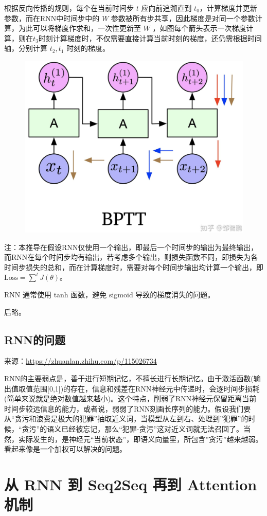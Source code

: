 \documentclass[12pt]{article}
\begin{document}
根据反向传播的规则，每个在当前时间步 $t$ 应向前追溯直到 $t_0$，计算梯度并更新参数，而在RNN中时间步中的 $W$ 参数被所有步共享，因此梯度是对同一个参数计算，为此可以将梯度作求和，一次性更新至 $W$ ，如图每个箭头表示一次梯度计算，则在$t_3$时刻计算梯度时，不仅需要直接计算当前时刻的梯度，还仍需根据时间轴，分别计算
$t_2,t_1$ 时刻的梯度。

\begin{figure}[H]
    \centering
    \includegraphics[width=.6\textwidth]{fig/RNN_BPTT_Process.png}
\end{figure}

注：本推导在假设RNN仅使用一个输出，即最后一个时间步的输出为最终输出，而RNN在每个时间步均有输出，若考虑多个输出，则损失函数不同，即损失为各时间步损失的总和，而在计算梯度时，需要对每个时间步输出均计算一个输出，即$\text{Loss} = \sum^tJ(\theta)$。

RNN 通常使用 tanh 函数，避免 sigmoid 导致的梯度消失的问题。

后略。

\subsection{RNN的问题}
来源：\url{https://zhuanlan.zhihu.com/p/115026734}

RNN的主要弱点是，善于进行短期记忆，不擅长进行长期记忆。由于激活函数(输出值取值范围[0,1])的存在，信息和残差在RNN神经元中传递时，会逐时间步损耗(简单来说就是绝对数值越来越小)。这个特点，削弱了RNN神经元保留距离当前时间步较远信息的能力，或者说，弱弱了RNN刻画长序列的能力。假设我们要从“贪污和浪费是极大的犯罪”抽取近义词，当模型从左到右、处理到”犯罪”的时候，“贪污”的语义已经被忘记，那么“犯罪-贪污”这对近义词就无法召回了。当然，实际发生的，是神经元“当前状态”，即语义向量里，所包含”贪污”越来越弱。看起来像是一个加权可以解决的问题。

\section{从 RNN 到 Seq2Seq 再到 Attention 机制\cite{Understand_RNN_Variants_Seq2Seq_Attention}}
\end{document}
